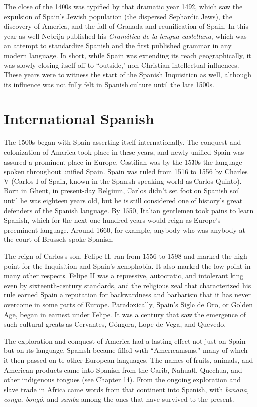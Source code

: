 The close of the 1400s was typified by that dramatic year
1492, which saw the expulsion of Spain's Jewish population (the dispersed Sephardic Jews), the discovery of America, and the fall of Granada and reunification of Spain. In this year as well Nebrija published
his \emph{Gramática de la lengua castellana}, which was an attempt to standardize Spanish and the first published grammar in any modern language. In short, while Spain was extending its reach geographically, it
was slowly closing itself off to ``outside," non-Christian intellectual influences. These years were to witness the start of the Spanish Inquisition as well, although its influence was not fully felt in Spanish culture until the late 1500s.

\section{International Spanish}

The 1500s began with Spain asserting itself internationally.
The conquest and colonization of America took place in these years,
and newly unified Spain was assured a prominent place in Europe.
Castilian was by the 1530s the language spoken throughout unified
Spain. Spain was ruled from 1516 to 1556 by Charles V (Carlos I of
Spain, known in the Spanish-speaking world as Carlos Quinto). Born
in Ghent, in present-day Belgium, Carlos didn't set foot on Spanish
soil until he was eighteen years old, but he is still considered one of
history's great defenders of the Spanish language. By 1550, Italian gentlemen took pains to learn Spanish, which for the next one hundred
years would reign as Europe's preeminent language. Around 1660, for
example, anybody who was anybody at the court of Brussels spoke
Spanish.

The reign of Carlos's son, Felipe II, ran from 1556 to 1598 and
marked the high point for the Inquisition and Spain's xenophobia. It
also marked the low point in many other respects. Felipe II was a repressive, autocratic, and intolerant king even by sixteenth-century
standards, and the religious zeal that characterized his rule earned
Spain a reputation for backwardness and barbarism that it has never
overcome in some parts of Europe. Paradoxically, Spain's Siglo de Oro,
or Golden Age, began in earnest under Felipe. It was a century that saw
the emergence of such cultural greats as Cervantes, Góngora, Lope de
Vega, and Quevedo.

The exploration and conquest of America had a lasting effect
not just on Spain but on its language. Spanish became filled with
``Americanisms," many of which it then passed on to other European
languages. The names of fruits, animals, and American products came
into Spanish from the Carib, Nahuatl, Quechua, and other indigenous
tongues (see Chapter 14). From the ongoing exploration and slave trade
in Africa came words from that continent into Spanish, with \emph{banana,
	conga, bongó}, and \emph{samba} among the ones that have survived to the
present.

